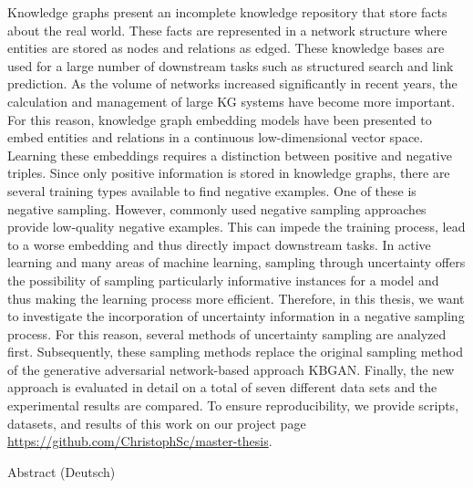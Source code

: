 %
\label{sec:abstract}
%
Knowledge graphs present an incomplete knowledge repository that store facts about the real world.
These facts are represented in a network structure where entities are stored as nodes and relations as edged.
These knowledge bases are used for a large number of downstream tasks such as structured search and link prediction.
As the volume of networks increased significantly in recent years, the calculation and management of large KG systems have become more important.
For this reason, knowledge graph embedding models have been presented to embed entities and relations in a continuous low-dimensional vector space.
Learning these embeddings requires a distinction between positive and negative triples.
Since only positive information is stored in knowledge graphs, there are several training types available to find negative examples.
One of these is negative sampling. 
However, commonly used negative sampling approaches provide low-quality negative examples.
This can impede the training process, lead to a worse embedding and thus directly impact downstream tasks.
In active learning and many areas of machine learning, sampling through uncertainty offers the possibility of sampling particularly informative instances for a model and thus making the learning process more efficient.
Therefore, in this thesis, we want to investigate the incorporation of uncertainty information in a negative sampling process.
For this reason, several methods of uncertainty sampling are analyzed first.
Subsequently, these sampling methods replace the original sampling method of the generative adversarial network-based approach KBGAN. 
Finally, the new approach is evaluated in detail on a total of seven different data sets and the experimental results are compared.
To ensure reproducibility, we provide scripts, datasets, and results of this work on our project page \url{https://github.com/ChristophSc/master-thesis}.

\vspace*{20mm}

{Abstract (Deutsch)}
\label{sec:abstract-german}
